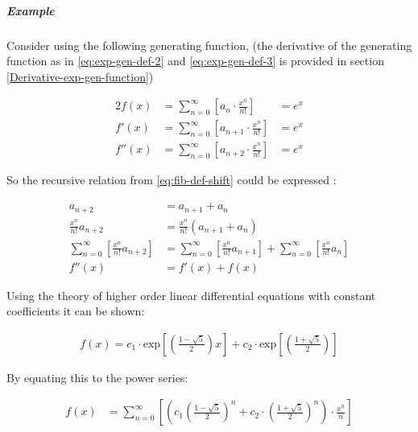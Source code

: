 \documentclass[11pt]{article}
\begin{document}
\subparagraph{Example}
\label{solving-the-sequence}
Consider using the following generating function, (the derivative of the
generating function as in \eqref{eq:exp-gen-def-2} and \eqref{eq:exp-gen-def-3} is
provided in section \ref{Derivative-exp-gen-function})




\begin{alignat}{2}
    f \left( x \right) &=  \sum^{\infty}_{n= 0}   \left[ a_{n} \cdot  \frac{x^n}{n!} \right]   &= e^x \label{eq:exp-gen-def-1} \\
    f'\left( x \right) &=  \sum^{\infty}_{n= 0}   \left[ a_{n+1} \cdot  \frac{x^n}{n!} \right]  &= e^x  \label{eq:exp-gen-def-2} \\
    f''\left( x \right) &=  \sum^{\infty}_{n= 0}   \left[ a_{n+2} \cdot  \frac{x^n}{n!} \right] &= e^x  \label{eq:exp-gen-def-3}
\end{alignat}


So the recursive relation from \eqref{eq:fib-def-shift}  could be expressed :


\begin{align*}
a_{n+  2}    &= a_{n+  1} +  a_{n}\\
\frac{x^n}{n!}   a_{n+  2}    &= \frac{x^n}{n!}\left( a_{n+  1} +  a_{n}  \right)\\
\sum^{\infty}_{n= 0} \left[ \frac{x^n}{n!}   a_{n+  2} \right]        &= \sum^{\infty}_{n= 0}   \left[ \frac{x^n}{n!} a_{n+  1} \right]  + \sum^{\infty}_{n= 0}   \left[ \frac{x^n}{n!} a_{n}  \right]  \\
f''\left( x \right) &= f'\left( x \right)+  f\left( x \right)
\end{align*}


Using the theory of higher order linear differential equations with
constant coefficients it can be shown:


\begin{align*}
f\left( x \right)= c_1 \cdot  \mathrm{exp}\left[ \left( \frac{1- \sqrt{5} }{2} \right)x \right] +  c_2 \cdot  \mathrm{exp}\left[ \left( \frac{1 +  \sqrt{5} }{2} \right) \right]
\end{align*}


By equating this to the power series:


\begin{align*}
f\left( x \right)&= \sum^{\infty}_{n= 0}   \left[ \left( c_1\left( \frac{1- \sqrt{5} }{2} \right)^n +  c_2 \cdot  \left( \frac{1+ \sqrt{5} }{2} \right)^n \right) \cdot  \frac{x^n}{n} \right]
\end{align*}
\end{document}
